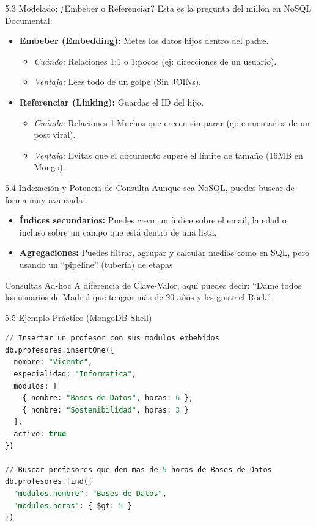 \begin{frame}{5.3 Modelado: ¿Embeber o Referenciar?}
    Esta es la pregunta del millón en NoSQL Documental:
    \begin{itemize}
        \item \textbf{Embeber (Embedding):} Metes los datos hijos dentro del padre.
        \begin{itemize}
            \item \textit{Cuándo:} Relaciones 1:1 o 1:pocos (ej: direcciones de un usuario).
            \item \textit{Ventaja:} Lees todo de un golpe (Sin JOINs).
        \end{itemize}
        \item \textbf{Referenciar (Linking):} Guardas el ID del hijo.
        \begin{itemize}
            \item \textit{Cuándo:} Relaciones 1:Muchos que crecen sin parar (ej: comentarios de un post viral).
            \item \textit{Ventaja:} Evitas que el documento supere el límite de tamaño (16MB en Mongo).
        \end{itemize}
    \end{itemize}
\end{frame}

\begin{frame}{5.4 Indexación y Potencia de Consulta}
    Aunque sea NoSQL, puedes buscar de forma muy avanzada:
    \begin{itemize}
        \item \textbf{Índices secundarios:} Puedes crear un índice sobre el email, la edad o incluso sobre un campo que está dentro de una lista.
        \item \textbf{Agregaciones:} Puedes filtrar, agrupar y calcular medias como en SQL, pero usando un ``pipeline'' (tubería) de etapas.
    \end{itemize}
    \begin{exampleblock}{Consultas Ad-hoc}
        A diferencia de Clave-Valor, aquí puedes decir: ``Dame todos los usuarios de Madrid que tengan más de 20 años y les guste el Rock''.
    \end{exampleblock}
\end{frame}

\begin{frame}[fragile]{5.5 Ejemplo Práctico (MongoDB Shell)}
    \begin{lstlisting}[language=SQL]
// Insertar un profesor con sus modulos embebidos
db.profesores.insertOne({
  nombre: "Vicente",
  especialidad: "Informatica",
  modulos: [
    { nombre: "Bases de Datos", horas: 6 },
    { nombre: "Sostenibilidad", horas: 3 }
  ],
  activo: true
})

// Buscar profesores que den mas de 5 horas de Bases de Datos
db.profesores.find({
  "modulos.nombre": "Bases de Datos",
  "modulos.horas": { $gt: 5 }
})
    \end{lstlisting}
\end{frame}
